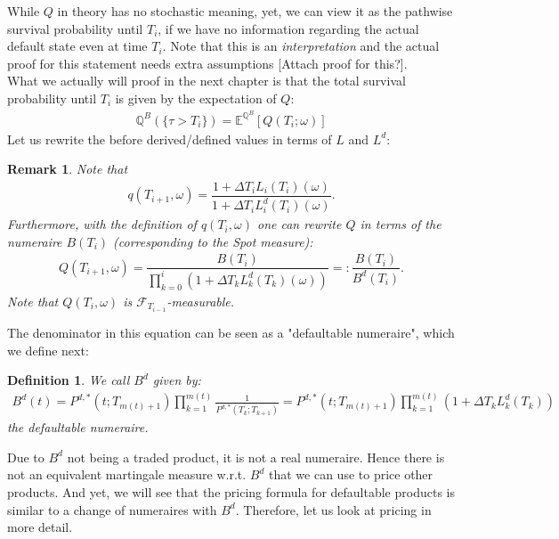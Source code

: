 \documentclass[12pt]{article}
\newtheorem{remark}[theorem]{Remark}
\newtheorem{definition}[theorem]{Definition}
\begin{document}
	While $Q$ in theory has no stochastic meaning, yet, we can view it as the pathwise survival probability until $T_i$, if we have no information regarding the actual default state even at time $T_i$. Note that this is an \emph{interpretation} and the actual proof for this statement needs extra assumptions \color{red}[Attach proof for this?]\color{black}.\\
	What we actually will proof in the next chapter is that the total survival probability until $T_i$ is given by the expectation of $Q$:
	\begin{align*}
		\mathbb{Q}^B\left(\{\tau > T_i\}\right) = \mathbb{E}^{\mathbb{Q}^B} \left[Q(T_i;\omega)\right]
	\end{align*}
	Let us rewrite the before derived/defined values in terms of $L$ and $L^d$:
	\begin{remark}
		Note that 
		\begin{align*}
			q(T_{i+1}, \omega) = \dfrac{1 + \Delta  T_i L_i(T_i)(\omega)}{1 + \Delta  T_i L^d_i(T_i)(\omega)}.
		\end{align*}
		Furthermore, with the definition of $q(T_i, \omega)$ one can rewrite $Q$ in terms of the numeraire $B(T_i)$ (corresponding to the Spot measure):
		\begin{align*}
			Q\left( T_{i+1}, \omega \right) = \dfrac{B(T_i)}{\prod_{k=0}^{i}(1 + \Delta T_k L^d_k(T_k)(\omega))} =: \dfrac{B(T_i)}{B^d(T_i)}.
		\end{align*}
		Note that $Q(T_i, \omega)$ is $\mathcal{F}_{T_{i-1}}$-measurable.
	\end{remark}
	The denominator in this equation can be seen as a "defaultable numeraire", which we define next:
	\begin{definition}
		We call $B^d$ given by:
		\begin{align*}
			B^d(t) = P^{d,*}(t;T_{m(t)+1}) \prod_{k=1}^{m(t)}\frac{1}{P^{d,*}(T_k;T_{k+1})} = P^{d,*}(t;T_{m(t)+1}) \prod_{k=1}^{m(t)}(1+\Delta T_k L^d_k(T_k))
		\end{align*}
		the \emph{defaultable numeraire}. 
	\end{definition}
	Due to $B^d$ not being a traded product, it is not a real numeraire. Hence there is not an equivalent martingale measure w.r.t. $B^d$ that we can use to price other products. And yet, we will see that the pricing formula for defaultable products is similar to a change of numeraires with $B^d$. Therefore, let us look at pricing in more detail.
	
	
	
	
\end{document}
